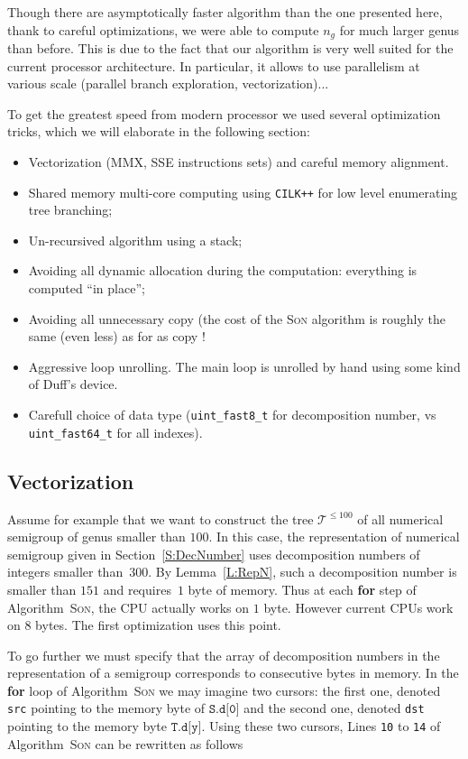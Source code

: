 \documentclass[reqno,11pt]{amsart}
\theoremstyle{plain}
\theoremstyle{definition}
\renewcommand{\leq}{\leqslant}
\renewcommand{\tt}[1]{\texttt{#1}}
\begin{document}
\label{S:Opti}

Though there are asymptotically faster algorithm than the one presented here,
thank to careful optimizations, we were able to compute $n_g$ for much larger
genus than before. This is due to the fact that our algorithm is very well
suited for the current processor architecture. In particular, it allows to use
parallelism at various scale (parallel branch exploration, vectorization)...

To get the greatest speed from modern processor we used several optimization
tricks, which we will elaborate in the following section:
\begin{itemize}
\item Vectorization (MMX, SSE instructions sets) and careful memory alignment.
\item Shared memory multi-core computing using \texttt{CILK++} for low level
  enumerating tree branching;
\item Un-recursived algorithm using a stack;
\item Avoiding all dynamic allocation during the computation: everything is
  computed ``in place'';
\item Avoiding all unnecessary copy (the cost of the \textsc{Son} algorithm is
  roughly the same (even less) as for as copy !
\item Aggressive loop unrolling. The main loop is unrolled by hand using some
  kind of Duff's device.
\item Carefull choice of data type (\verb|uint_fast8_t| for decomposition
  number, vs \verb|uint_fast64_t| for all indexes).
\end{itemize}

\subsection{Vectorization}

Assume for example that we want to construct the tree $\mathcal{T}^{\leq 100}$ of all  numerical semigroup of  genus smaller than $100$. 
In this case, the representation of  numerical  semigroup given in Section~\ref{S:DecNumber} uses decomposition numbers of integers smaller than~$300$.
By Lemma~\ref{L:RepN}, such a decomposition number is smaller than $151$ and requires~$1$ byte of memory.
Thus at each \textbf{for} step of Algorithm~\textsc{Son}, the CPU actually works on $1$ byte. 
However current CPUs work on $8$ bytes.
The first optimization uses this point.

To go further we must specify that the array of decomposition numbers in the representation of a semigroup corresponds to consecutive bytes in memory. 
In the \textbf{for} loop of Algorithm~\textsc{Son} we may imagine two cursors: the first one, denoted \texttt{src}  pointing to the memory byte of $\texttt{S.d[0]}$  and the second one, denoted \texttt{dst} pointing to the memory byte $\texttt{T.d[y]}$.
Using these two cursors, Lines \tt{10} to \tt{14} of Algorithm~\textsc{Son} can be rewritten as follows
\end{document}
